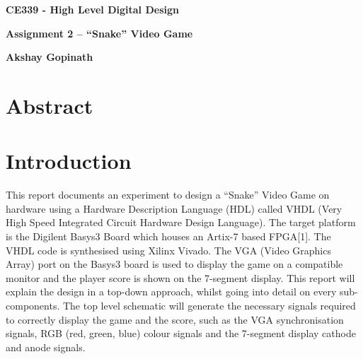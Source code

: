 \documentclass[aps, secnumarabic, balancelastpage, asmath, amssymb, nofootinbib, floatfix,]{revtex4-2}
\begin{document}

\thispagestyle{plain}
\begin{center}
    \Large
    \textbf{CE339 - High Level Digital Design}
        
    \vspace{0.4cm}
    \large
    \textbf{Assignment 2 -- ``Snake'' Video Game}
        
    \vspace{0.4cm}
    \textbf{Akshay Gopinath}
       
    \section*{Abstract}
    \fontsize{11pt}{12pt}\selectfont
    
\end{center}
\fontsize{11pt}{12pt}\selectfont
{
\setlength{\parindent}{0pt}


}
\clearpage

\tableofcontents

\clearpage

\listoffigures
\clearpage

\listoftables

\clearpage


\section{\fontsize{11.3pt}{12pt}\selectfont \bf Introduction}
\fontsize{11pt}{12pt}\selectfont
\label{sec:1}

{
\setlength{\parindent}{0pt}

This report documents an experiment to design a ``Snake'' Video Game on hardware using a Hardware Description Language (HDL) called VHDL (Very High Speed Integrated Circuit Hardware Design Language). The target platform is the Digilent Basys3 Board which houses an Artix-7 based FPGA[1]. The VHDL code is synthesised using Xilinx Vivado. The VGA (Video Graphics Array) port on the Basys3 board is used to display the game on a compatible monitor and the player score is shown on the 7-segment display. This report will explain the design in a top-down approach, whilst going into detail on every sub-components. The top level schematic will generate the necessary signals required to correctly display the game and the score, such as the VGA synchronisation signals, RGB (red, green, blue) colour signals and the 7-segment display cathode and anode signals.




}
\end{document}
